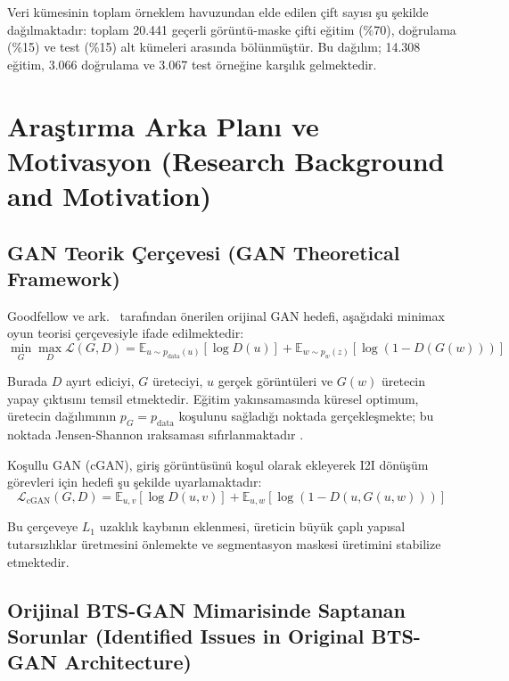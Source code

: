 \documentclass[10pt,journal,compsoc]{IEEEtran}
\begin{document}
Veri kümesinin toplam örneklem havuzundan elde edilen çift sayısı şu şekilde dağılmaktadır: toplam 20.441 geçerli görüntü-maske çifti eğitim (\%70), doğrulama (\%15) ve test (\%15) alt kümeleri arasında bölünmüştür. Bu dağılım; 14.308 eğitim, 3.066 doğrulama ve 3.067 test örneğine karşılık gelmektedir.

\section{Araştırma Arka Planı ve Motivasyon \textnormal{\small{(Research Background and Motivation)}}}

\subsection{GAN Teorik Çerçevesi \textnormal{\small{(GAN Theoretical Framework)}}}

Goodfellow ve ark.\ \cite{goodfellow2014generative} tarafından önerilen orijinal GAN hedefi, aşağıdaki minimax oyun teorisi çerçevesiyle ifade edilmektedir:
\begin{equation}
\min_G \max_D \mathcal{L}(G,D) = \mathbb{E}_{u \sim p_{\text{data}}(u)}[\log D(u)] + \mathbb{E}_{w \sim p_w(z)}[\log(1 - D(G(w)))]
\end{equation}

Burada $D$ ayırt ediciyi, $G$ üreteciyi, $u$ gerçek görüntüleri ve $G(w)$ üretecin yapay çıktısını temsil etmektedir. Eğitim yakınsamasında küresel optimum, üretecin dağılımının $p_G = p_{\text{data}}$ koşulunu sağladığı noktada gerçekleşmekte; bu noktada Jensen-Shannon ıraksaması sıfırlanmaktadır \cite{goodfellow2014generative}.

Koşullu GAN (cGAN), giriş görüntüsünü koşul olarak ekleyerek I2I dönüşüm görevleri için hedefi şu şekilde uyarlamaktadır:
\begin{equation}
\mathcal{L}_{\text{cGAN}}(G,D) = \mathbb{E}_{u,v}[\log D(u,v)] + \mathbb{E}_{u,w}[\log(1 - D(u, G(u,w)))]
\end{equation}

Bu çerçeveye $L_1$ uzaklık kaybının eklenmesi, üreticin büyük çaplı yapısal tutarsızlıklar üretmesini önlemekte ve segmentasyon maskesi üretimini stabilize etmektedir.

\subsection{Orijinal BTS-GAN Mimarisinde Saptanan Sorunlar \textnormal{\small{(Identified Issues in Original BTS-GAN Architecture)}}}
\end{document}
